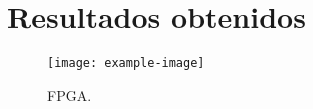 \chapter{Resultados obtenidos}
	\label{sec:resultados}
\lipsum[1]

\begin{figure}[H]
	\centering
	\texttt{[image: example-image]}
	\centering\caption{FPGA.}
	\label{fig:LABEL}
\end{figure}










